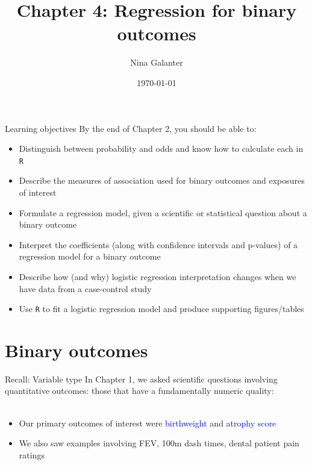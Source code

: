 \documentclass[10pt,t]{beamer}
\title{Chapter 4: Regression for binary outcomes}
\author{Nina Galanter}
\date{\today}
\begin{document}
	\begin{frame}
	\titlepage 
\end{frame}

\begin{frame}{Learning objectives}
	By the end of Chapter 2, you should be able to: 
	\begin{itemize}
		\item Distinguish between probability and odds and know how to calculate each in \texttt{R}
		\item Describe the measures of association used for binary outcomes and exposures of interest
		\item Formulate a regression model, given a scientific or statistical question about a binary outcome
		\item Interpret the coefficients (along with confidence intervals and p-values) of a regression model for a binary outcome
		\item Describe how (and why) logistic regression interpretation changes when we have data from a case-control study
		\item Use \texttt{R} to fit a logistic regression model and produce supporting figures/tables
	\end{itemize}
\end{frame}



\section{Binary outcomes}

\begin{frame}{Recall: Variable type}
	In Chapter 1, we asked scientific questions involving quantitative outcomes: those that have a fundamentally numeric quality: 
	\\~\
	
	\begin{itemize}
		\item Our primary outcomes of interest were \textcolor{blue}{birthweight} and \textcolor{blue}{atrophy score}
		\bigskip
		
		\item We also saw examples involving FEV, 100m dash times, dental patient pain ratings
	\end{itemize}
\end{frame}
\end{document}
